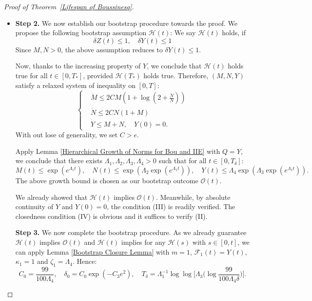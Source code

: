 \documentclass[12pt,letterpaper]{article}
\theoremstyle{plain}
\begin{document}
\begin{proof}[Proof of Theorem~\ref{Lifespan of Boussinesq}]
\begin{itemize}
\item \textbf{Step 2.} We now establish our bootstrap procedure towards the proof. We propose the following bootstrap assumption $\mathscr H(t)$: We say $\mathscr H(t)$ holds, if 
\begin{equation}\label{Bootstrap Assumption}
 \delta Z(t)\le 1,\quad \delta Y(t)\le 1   
\end{equation}
 Since $M,N>0$, the above assumption reduces to $\delta Y(t)\le 1$.

Now, thanks to the increasing property of $Y$, we conclude that $\mathscr H(t)$  holds true for all $t\in [0,T_*]$, provided $\mathscr H(T_*)$ holds true. Therefore, $(M,N,Y)$ satisfy a relaxed system of inequality on $[0,T]$:
 \begin{equation*}
\left\{
\begin{aligned}
&\dot M\le 2CM(1+\log(2+\frac{\dot N}{N})) \\
&\dot N\le 2CN (1+M)\\
& \dot Y\le M+N,\quad Y(0)=0.
\end{aligned}
\right.
\end{equation*}
With out lose of generality, we set $C>e$. 

Apply Lemma \ref{Hierarchical Growth of Norms for Bou and IIE} with $Q=Y$, we conclude that there exists $\Lambda_1,\Lambda_2,\Lambda_3,\Lambda_4>0$ such that for all $t\in [0,T_\delta]$:
\begin{equation*}
M(t)\le \exp(e^{\Lambda_1t}),\quad N(t)\le \exp(\Lambda_2\exp(e^{\Lambda_1 t})),\quad Y(t)\le \Lambda_4\exp(\Lambda_3\exp(e^{\Lambda_1 t})).
\end{equation*}
The above growth bound is chosen as our bootstrap outcome $\mathscr O(t)$.

We already showed that $\mathscr H(t)$ implies $\mathscr O(t)$. Meanwhile, by absolute continuity of $Y$ and $Y(0)=0$, the condition (III) is readily verified. The closedness condition (IV) is obvious and it suffices to verify (II).

\textbf{Step 3.} We now complete the bootstrap procedure. As we already guarantee $\mathscr H(t)$ implies $\mathscr O(t)$ and $\mathscr H(t)$ implies for any $\mathscr H(s)$ with $s\in [0,t]$, we can apply Lemma \ref{Bootstrap Closure Lemma} with $m=1$, $\mathcal F_1(t)=Y(t)$, $\kappa_1=1$ and $\zeta_1=\Lambda_4$. Hence:
\begin{equation*}
C_0=\frac{99}{100 \Lambda_4},\quad \delta_0=C_0\exp(-C_3 e^{2}),\quad T_\delta=\Lambda_1^{-1}\log\log\Big[\Lambda_3\Big(\log \frac{99}{100\Lambda_4\delta}\Big)\Big].
\end{equation*}


\end{itemize}
\end{proof}
\end{document}
